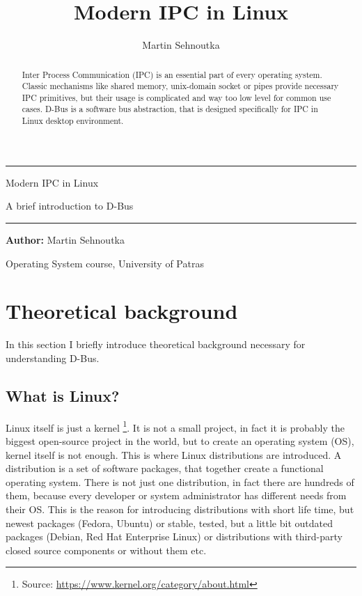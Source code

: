 \documentclass[a4paper,10.5pt]{article}
\title{Modern IPC in Linux}
\author{Martin Sehnoutka}
\begin{document}
\begin{center}

\noindent\rule{16cm}{0.4pt}

\huge Modern IPC in Linux

\large A brief introduction to D-Bus

\noindent\rule{16cm}{0.4pt}

\end{center}

\textbf{Author:} Martin Sehnoutka

Operating System course, University of Patras

\tableofcontents

\begin{abstract}
Inter Process Communication (IPC) is an essential part of every operating system. Classic mechanisms like shared memory, unix-domain socket or pipes provide necessary IPC primitives, but their usage is complicated and way too low level for common use cases. D-Bus is a software bus abstraction, that is designed specifically for IPC in Linux desktop environment.
\end{abstract}

\section{Theoretical background}

In this section I briefly introduce theoretical background necessary for understanding D-Bus.

\subsection{What is Linux?}
Linux itself is just a kernel \footnote{Source: \url{https://www.kernel.org/category/about.html}}. It is not a small project, in fact it is probably the biggest open-source project in the world, but to create an operating system (OS), kernel itself is not enough. This is where Linux distributions are introduced. A distribution is a set of software packages, that together create a functional operating system. There is not just one distribution, in fact there are hundreds of them, because every developer or system administrator has different needs from their OS. This is the reason for introducing distributions with short life time, but newest packages (Fedora, Ubuntu) or stable, tested, but a little bit outdated packages (Debian, Red Hat Enterprise Linux) or distributions with third-party closed source components or without them etc.
\end{document}
